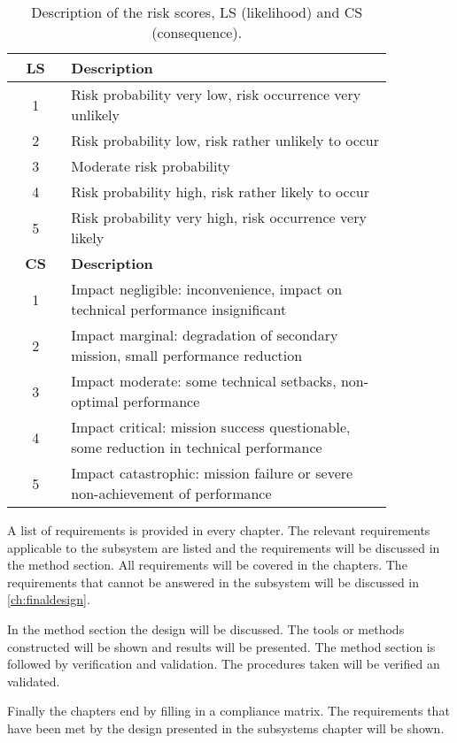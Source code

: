 \begin{table}[H]
    \caption{Description of the risk scores, LS (likelihood) and CS (consequence).}
    \label{tab:risk_LSandCS}
    \centering
    \begin{tabular}{c|p{0.85\linewidth}} \hline
        \textbf{LS} & \textbf{Description} \\ \hline
        1 & Risk probability very low, risk occurrence very unlikely \\
        2 & Risk probability low, risk rather unlikely to occur \\
        3 & Moderate risk probability \\
        4 & Risk probability high, risk rather likely to occur \\
        5 & Risk probability very high, risk occurrence very likely \\ \hline \hline
        \textbf{CS} & \textbf{Description} \\ \hline
        1 & Impact negligible: inconvenience, impact on technical performance insignificant \\
        2 & Impact marginal: degradation of secondary mission, small performance reduction \\
        3 & Impact moderate: some technical setbacks, non-optimal performance \\
        4 & Impact critical: mission success questionable, some reduction in technical performance \\
        5 & Impact catastrophic: mission failure or severe non-achievement of performance \\
    \end{tabular}
\end{table}

A list of requirements is provided in every chapter. The relevant requirements applicable to the subsystem are listed and the requirements will be discussed in the method section. All requirements will be covered in the chapters. The requirements that cannot be answered in the subsystem will be discussed in \autoref{ch:finaldesign}.

In the method section the design will be discussed. The tools or methods constructed will be shown and results will be presented. The method section is followed by verification and validation. The procedures taken will be verified an validated.

Finally the chapters end by filling in a compliance matrix. The requirements that have been met by the design presented in the subsystems chapter will be shown.

